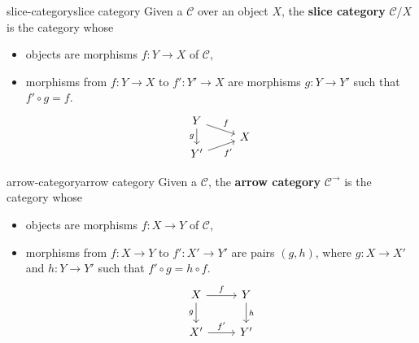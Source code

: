
\begin{topic}{slice-category}{slice category}
    Given a  $\mathcal{C}$ over an object $X$, the \textbf{slice category} $\mathcal{C}/X$ is the category whose
    \begin{itemize}
        \item objects are morphisms $f : Y \to X$ of $\mathcal{C}$,
        \item morphisms from $f : Y \to X$ to $f' : Y' \to X$ are morphisms $g : Y \to Y'$ such that $f' \circ g = f$.
        \[ \begin{tikzcd}[row sep=0em] Y \arrow{rd}{f} \arrow[swap]{dd}{g} & \\ & X \\ Y' \arrow[swap]{ur}{f'} & \end{tikzcd} \]
    \end{itemize}
\end{topic}

\begin{topic}{arrow-category}{arrow category}
    Given a  $\mathcal{C}$, the \textbf{arrow category} $\mathcal{C}^\rightarrow$ is the category whose
    \begin{itemize}
        \item objects are morphisms $f : X \to Y$ of $\mathcal{C}$,
        \item morphisms from $f : X \to Y$ to $f' : X' \to Y'$ are pairs $(g, h)$, where $g : X \to X'$ and $h : Y \to Y'$ such that $f' \circ g = h \circ f$.
        \[ \begin{tikzcd} X \arrow{r}{f} \arrow[swap]{d}{g} & Y \arrow{d}{h} \\ X' \arrow{r}{f'} & Y' \end{tikzcd} \]
    \end{itemize}
\end{topic}

